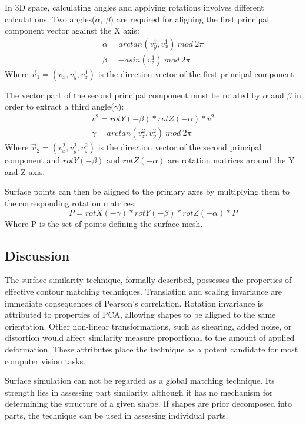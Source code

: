 \documentclass[11]{article}
\begin{document}
In 3D space, calculating angles and applying rotations involves different calculations.
Two angles($\alpha,\ \beta$) are required for aligning the first principal component vector against the X axis: 
\begin{equation*}
  \begin{split}
    \alpha = arctan(v_y^1,v_x^1)\ mod\ 2\pi\\
    \beta = -asin(v_z^1)\ mod\ 2\pi
  \end{split}
\end{equation*}
Where $\vec{v}_1=(v_x^1,v_y^1,v_z^1)$ is the direction vector of the first principal component.

The vector part of the second principal component must be rotated by $\alpha$ and $\beta$ in order to extract a third angle($\gamma$): 
\begin{equation*}
  \begin{split}
    v^2 = rotY(-\beta) * rotZ(-\alpha) * v^2\\
    \gamma = arctan(v_z^2,v_y^2)\ mod\ 2\pi 
  \end{split}
\end{equation*}
Where $\vec{v}_2=(v_x^2,v_y^2,v_z^2)$ is the direction vector of the second principal component and $rotY(-\beta)$ and $rotZ(-\alpha)$ are rotation matrices around the Y and Z axis.   

Surface points can then be aligned to the primary axes by multiplying them to the corresponding rotation matrices:  
\begin{equation*}
   P = rotX(-\gamma) * rotY(-\beta) * rotZ(-\alpha) * P
\end{equation*}
Where P is the set of points defining the surface mesh.

\subsection{Discussion}
The surface similarity technique, formally described, possesses the properties of effective contour matching techniques.
Translation and scaling invariance are immediate consequences of Pearson's correlation. 
Rotation invariance is attributed to  properties of PCA, allowing shapes to be aligned to the same orientation. 
Other non-linear transformations, such as shearing, added noise, or distortion would affect similarity measure proportional to the amount of applied deformation.    
These attributes place the technique as a potent candidate for most computer vision tasks.

Surface simulation can not be regarded as a global matching technique. 
Its strength lies in assessing part similarity, although it has no mechanism for determining the structure of a given shape.  
If shapes are prior decomposed into parts, the technique can be used in assessing individual parts. 
\end{document}
